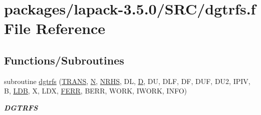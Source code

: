\hypertarget{dgtrfs_8f}{}\section{packages/lapack-\/3.5.0/\+S\+R\+C/dgtrfs.f File Reference}
\label{dgtrfs_8f}
\subsection*{Functions/\+Subroutines}
\begin{DoxyCompactItemize}
\item 
subroutine \hyperlink{group__doubleGTcomputational_ga20d15d564aefd2fcd3b19f7511dfe17a}{dgtrfs} (\hyperlink{superlu__enum__consts_8h_a0c4e17b2d5cea33f9991ccc6a6678d62a1f61e3015bfe0f0c2c3fda4c5a0cdf58}{T\+R\+A\+N\+S}, \hyperlink{polmisc_8c_a0240ac851181b84ac374872dc5434ee4}{N}, \hyperlink{example__user_8c_aa0138da002ce2a90360df2f521eb3198}{N\+R\+H\+S}, D\+L, \hyperlink{odrpack_8h_a7dae6ea403d00f3687f24a874e67d139}{D}, D\+U, D\+L\+F, D\+F, D\+U\+F, D\+U2, I\+P\+I\+V, B, \hyperlink{example__user_8c_a50e90a7104df172b5a89a06c47fcca04}{L\+D\+B}, X, L\+D\+X, \hyperlink{superlu__enum__consts_8h_af00a42ecad444bbda75cde1b64bd7e72a78fd14d7abebae04095cfbe02928f153}{F\+E\+R\+R}, B\+E\+R\+R, W\+O\+R\+K, I\+W\+O\+R\+K, I\+N\+F\+O)
\begin{DoxyCompactList}\small\item\em {\bfseries D\+G\+T\+R\+F\+S} \end{DoxyCompactList}\end{DoxyCompactItemize}
